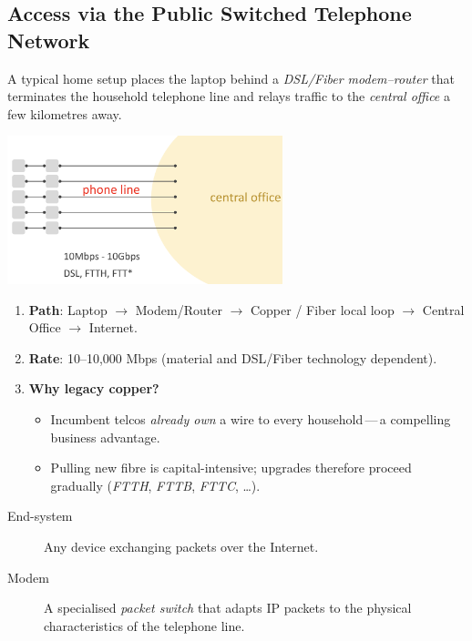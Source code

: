 \documentclass[../../compsys.tex]{subfiles}
\begin{document}
\subsection{Access via the Public Switched Telephone Network}
A typical home setup places the laptop behind a
\emph{DSL/Fiber modem–router} that terminates the household
telephone line and relays traffic to the \emph{central office}
a few kilometres away.

\begin{center}
  \includegraphics[width=0.6\textwidth]{images/phone-line.png}
\end{center}

\begin{enumerate}
  \item \textbf{Path}: Laptop $\rightarrow$ Modem/Router $\rightarrow$
        Copper / Fiber local loop $\rightarrow$ Central Office $\rightarrow$ Internet.
  \item \textbf{Rate}: 10--10,000 Mbps 
        (material and DSL/Fiber technology dependent).
  \item \textbf{Why legacy copper?}
        \begin{itemize}
          \item Incumbent telcos \emph{already own} a wire to every
                household\,—\,a compelling business advantage.
          \item Pulling new fibre is capital-intensive; upgrades therefore
                proceed gradually (\emph{FTTH}, \emph{FTTB}, \emph{FTTC}, \dots).
        \end{itemize}
\end{enumerate}

\begin{description}
  \item[End-system] Any device exchanging packets over the Internet.
  \item[Modem] A specialised \emph{packet switch} that adapts IP packets
               to the physical characteristics of the telephone line.
\end{description}
\end{document}

